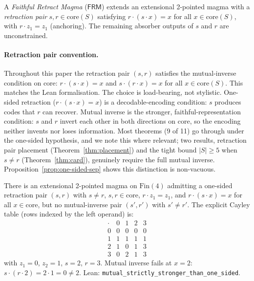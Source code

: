 \documentclass[sigconf,screen]{acmart}
\newcommand{\dotop}{\cdot}
\newcommand{\FRM}{\textsf{FRM}}
\newcommand{\Fin}{\mathrm{Fin}}
\newcommand{\core}{\mathrm{core}}
\theoremstyle{remark}
\begin{document}
\begin{definition}
\label{def:frm}
A \emph{Faithful Retract Magma} ($\FRM$) extends an extensional 2-pointed
magma with a \emph{retraction pair} $s, r \in \core(S)$ satisfying
$r \dotop (s \dotop x) = x$ for all $x \in \core(S)$, with
$r \dotop z_1 = z_1$ (anchoring). The remaining absorber outputs of $s$
and $r$ are unconstrained.
\end{definition}

\paragraph{Retraction pair convention.}
\label{rem:mutual}
Throughout this paper the retraction pair $(s, r)$ satisfies the
mutual-inverse condition on core: $r \dotop (s \dotop x) = x$ and
$s \dotop (r \dotop x) = x$ for all $x \in \core(S)$. This matches the
Lean formalisation. The choice is load-bearing, not stylistic.
One-sided retraction ($r \dotop (s \dotop x) = x$) is a
decodable-encoding condition: $s$ produces codes that $r$ can recover.
Mutual inverse is the stronger, faithful-representation condition: $s$
and $r$ invert each other in both directions on core, so the encoding
neither invents nor loses information. Most theorems (9 of 11) go
through under the one-sided hypothesis, and we note this where relevant;
two results, retraction pair placement (Theorem~\ref{thm:placement}) and
the tight bound $|S| \geq 5$ when $s \neq r$ (Theorem~\ref{thm:card}),
genuinely require the full mutual inverse.
Proposition~\ref{prop:one-sided-sep} shows this distinction is
non-vacuous.

\begin{proposition}
\label{prop:one-sided-sep}
There is an extensional 2-pointed magma on $\Fin(4)$ admitting a
one-sided retraction pair $(s, r)$ with $s \neq r$, $s, r \in \core$,
$r \dotop z_1 = z_1$, and $r \dotop (s \dotop x) = x$ for all
$x \in \core$, but no mutual-inverse pair $(s', r')$ with $s' \neq r'$.
The explicit Cayley table (rows indexed by the left operand) is:
\[
\begin{array}{c|cccc}
\dotop & 0 & 1 & 2 & 3 \\ \hline
0 & 0 & 0 & 0 & 0 \\
1 & 1 & 1 & 1 & 1 \\
2 & 1 & 0 & 1 & 3 \\
3 & 0 & 2 & 1 & 3
\end{array}
\]
with $z_1 = 0$, $z_2 = 1$, $s = 2$, $r = 3$. Mutual inverse fails at
$x = 2$: $s \dotop (r \dotop 2) = 2 \dotop 1 = 0 \neq 2$. Lean:
\texttt{mutual\_strictly\_stronger\_than\_one\_sided}.
\end{proposition}
\end{document}
